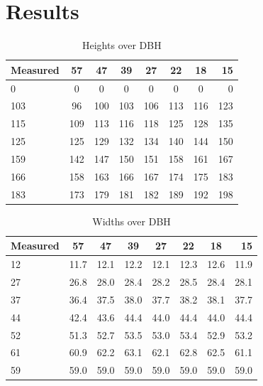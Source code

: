 \section{Results}
\begin{table}[h!]
	\begin{center}
		\begin{tabular}{| l c c c c c c r |}		
		\hline
		Measured & 57\degree & 47\degree & 39\degree & 27\degree & 22\degree & 18\degree & 15\degree \\
		\hline
		0 		& 0 	& 0 	& 0 	& 0 	& 0 	& 0 	& 0 	\\
		103 	& 96 	& 100 	& 103 	& 106 	& 113 	& 116 	& 123 	\\
		115 	& 109 	& 113 	& 116 	& 118 	& 125 	& 128 	& 135 	\\
		125 	& 125 	& 129	& 132 	& 134 	& 140 	& 144 	& 150 	\\
		159 	& 142 	& 147 	& 150 	& 151 	& 158 	& 161 	& 167 	\\
		166 	& 158 	& 163 	& 166 	& 167 	& 174 	& 175 	& 183 	\\
		183 	& 173 	& 179 	& 181	& 182 	& 189 	& 192 	& 198 	\\
		\hline
		\end{tabular}
		\caption{Heights over DBH}
		\label{heights}
	\end{center}
\end{table}

\begin{table}[h!]
	\begin{center}
		\begin{tabular}{| l c c c c c c r |}
		\hline
		Measured & 57\degree & 47\degree & 39\degree & 27\degree & 22\degree & 18\degree & 15\degree \\
		\hline
		12       & 11.7      & 12.1      & 12.2      & 12.1      & 12.3      & 12.6      & 11.9      \\
		27       & 26.8      & 28.0      & 28.4      & 28.2      & 28.5      & 28.4      & 28.1      \\
		37       & 36.4      & 37.5      & 38.0      & 37.7      & 38.2      & 38.1      & 37.7      \\
		44       & 42.4      & 43.6      & 44.4      & 44.0      & 44.4      & 44.0      & 44.4      \\
		52       & 51.3      & 52.7      & 53.5      & 53.0      & 53.4      & 52.9      & 53.2      \\
		61       & 60.9      & 62.2      & 63.1      & 62.1      & 62.8      & 62.5      & 61.1      \\
		59       & 59.0      & 59.0      & 59.0      & 59.0      & 59.0      & 59.0      & 59.0      \\
		\hline
		\end{tabular}
		\caption{Widths over DBH}
		\label{widths}
    \end{center}
\end{table}

